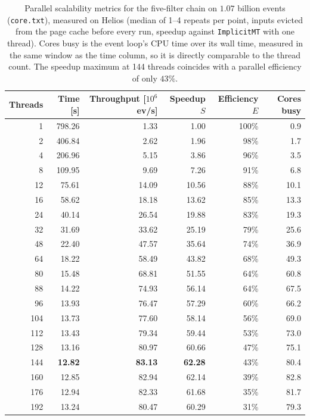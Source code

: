 \begin{table}[htbp]
\centering
\caption{Parallel scalability metrics for the five-filter chain on $1.07$ billion events (\texttt{core.txt}), measured on Helios (median of 1--4 repeats per point, inputs evicted from the page cache before every run, speedup against \texttt{ImplicitMT} with one thread). Cores busy is the event loop's CPU time over its wall time, measured in the same window as the time column, so it is directly comparable to the thread count. The speedup maximum at 144 threads coincides with a parallel efficiency of only $43\%$.}
\label{tab:scalability-chain}
\begin{tabular}{rrrrrr}
\toprule
Threads & Time [s] & Throughput [$10^6$ ev/s] & Speedup $S$ & Efficiency $E$ & Cores busy \\
\midrule
 1 & 798.26 & 1.33 & 1.00 & 100\% & 0.9 \\
 2 & 406.84 & 2.62 & 1.96 & 98\% & 1.7 \\
 4 & 206.96 & 5.15 & 3.86 & 96\% & 3.5 \\
 8 & 109.95 & 9.69 & 7.26 & 91\% & 6.8 \\
12 & 75.61 & 14.09 & 10.56 & 88\% & 10.1 \\
16 & 58.62 & 18.18 & 13.62 & 85\% & 13.3 \\
24 & 40.14 & 26.54 & 19.88 & 83\% & 19.3 \\
32 & 31.69 & 33.62 & 25.19 & 79\% & 25.6 \\
48 & 22.40 & 47.57 & 35.64 & 74\% & 36.9 \\
64 & 18.22 & 58.49 & 43.82 & 68\% & 49.3 \\
80 & 15.48 & 68.81 & 51.55 & 64\% & 60.8 \\
88 & 14.22 & 74.93 & 56.14 & 64\% & 67.5 \\
96 & 13.93 & 76.47 & 57.29 & 60\% & 66.2 \\
104 & 13.73 & 77.60 & 58.14 & 56\% & 69.0 \\
112 & 13.43 & 79.34 & 59.44 & 53\% & 73.0 \\
128 & 13.16 & 80.97 & 60.66 & 47\% & 75.1 \\
144 & \textbf{12.82} & \textbf{83.13} & \textbf{62.28} & 43\% & 80.4 \\
160 & 12.85 & 82.94 & 62.14 & 39\% & 82.8 \\
176 & 12.94 & 82.33 & 61.68 & 35\% & 81.7 \\
192 & 13.24 & 80.47 & 60.29 & 31\% & 79.3 \\
\bottomrule
\end{tabular}
\end{table}
